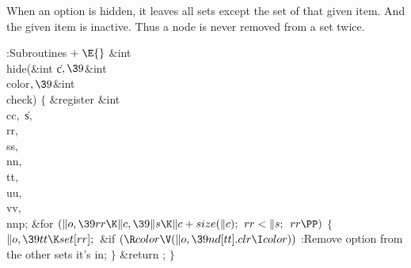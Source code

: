 When an option is hidden, it leaves all sets except the set of that
given item. And the given item is inactive.
Thus a node is never removed from a set twice.

\Y\B\4:Subroutines\X${}\mathrel+\E{}$\6
\1\1\&{int} \\{hide}(\&{int} \|c${},\39{}$\&{int} \\{color}${},\39{}$\&{int} %
\\{check})\2\2\6
${}\{{}$\1\6
\&{register} \&{int} \\{cc}${},{}$ \|s${},{}$ \\{rr}${},{}$ \\{ss}${},{}$ %
\\{nn}${},{}$ \\{tt}${},{}$ \\{uu}${},{}$ \\{vv}${},{}$ \\{nnp};\7
\&{for} ${}(\|o,\39\\{rr}\K\|c,\39\|s\K\|c+\\{size}(\|c);{}$ ${}\\{rr}<\|s;{}$
${}\\{rr}\PP){}$\5
${}\{{}$\1\6
${}\|o,\39\\{tt}\K\\{set}[\\{rr}];{}$\6
\&{if} ${}(\R\\{color}\V(\|o,\39\\{nd}[\\{tt}].\\{clr}\I\\{color})){}$\1\5
:Remove option  from the other sets it's in\X;\2\6
\4${}\}{}$\2\6
\&{return} ;\6
\4${}\}{}$\2\par
\fi

